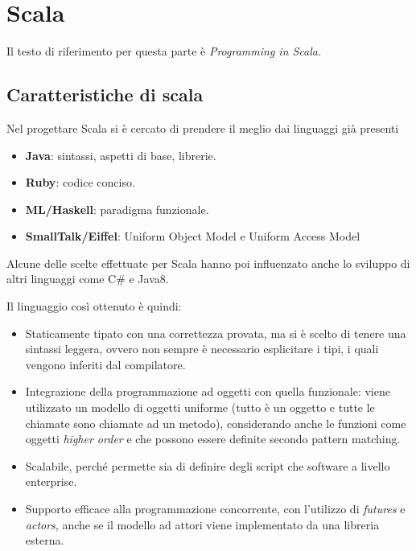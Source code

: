

\chapter{Scala}

Il testo di riferimento per questa parte è \textit{Programming in Scala}.

\section{Caratteristiche di scala}

Nel progettare Scala si è cercato di prendere il meglio dai linguaggi già presenti

\begin{itemize}
	\item \textbf{Java}: sintassi, aspetti di base, librerie.
	\item \textbf{Ruby}: codice conciso.
	\item \textbf{ML/Haskell}: paradigma funzionale.
	\item \textbf{SmallTalk/Eiffel}: Uniform Object Model e Uniform Access Model	
\end{itemize}

Alcune delle scelte effettuate per Scala hanno poi influenzato anche lo sviluppo di altri linguaggi come C\# e Java8.

Il linguaggio così ottenuto è quindi:

\begin{itemize}
	\item Staticamente tipato con una correttezza provata, ma si è scelto di tenere una sintassi leggera, ovvero non sempre è necessario esplicitare i tipi, i quali vengono inferiti dal compilatore.
	\item Integrazione della programmazione ad oggetti con quella funzionale: viene utilizzato un modello di oggetti uniforme (tutto è un oggetto e tutte le chiamate sono chiamate ad un metodo), considerando anche le funzioni come oggetti \textit{higher order} e che possono essere definite secondo pattern matching.
	\item Scalabile, perché permette sia di definire degli script che software a livello enterprise. 
	\item Supporto efficace alla programmazione concorrente, con l'utilizzo di \textit{futures} e \textit{actors}, anche se il modello ad attori viene implementato da una libreria esterna.
\end{itemize}

